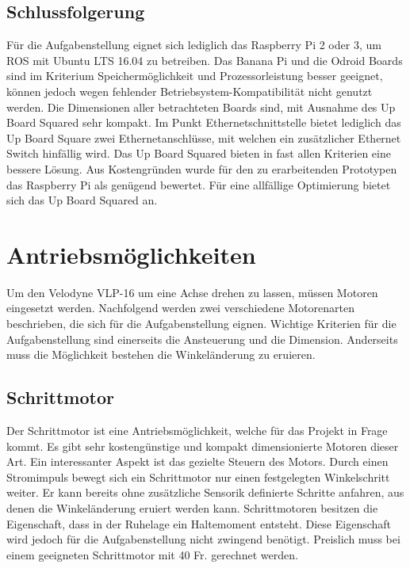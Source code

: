 \subsection{Schlussfolgerung}
\label{subsec:Schlussfolgerung}
Für die Aufgabenstellung eignet sich lediglich das Raspberry Pi 2 oder 3, um ROS mit Ubuntu LTS 16.04 zu betreiben. Das Banana Pi und die Odroid Boards sind im Kriterium Speichermöglichkeit und Prozessorleistung besser geeignet, können jedoch wegen fehlender Betriebsystem-Kompatibilität nicht genutzt werden. Die Dimensionen aller betrachteten Boards sind, mit Ausnahme des Up Board Squared sehr kompakt. Im Punkt Ethernetschnittstelle bietet lediglich das Up Board Square zwei Ethernetanschlüsse, mit welchen ein zusätzlicher Ethernet Switch hinfällig wird. Das Up Board Squared bieten in fast allen Kriterien eine bessere Lösung. Aus Kostengründen wurde für den zu erarbeitenden Prototypen das Raspberry Pi als genügend bewertet. Für eine allfällige Optimierung bietet sich das Up Board Squared an.

\section{Antriebsmöglichkeiten}
\label{sec:Antriebsmoeglichkeiten}
Um den Velodyne VLP-16 um eine Achse drehen zu lassen, müssen Motoren eingesetzt werden. Nachfolgend werden zwei verschiedene Motorenarten beschrieben, die sich für die Aufgabenstellung eignen. Wichtige Kriterien für die Aufgabenstellung sind einerseits die Ansteuerung und die Dimension. Anderseits muss die Möglichkeit bestehen die Winkeländerung zu eruieren. 

\subsection{Schrittmotor}
\label{subsec:Schrittmotor}
Der Schrittmotor ist eine Antriebsmöglichkeit, welche für das Projekt in Frage kommt. Es gibt sehr kostengünstige und kompakt dimensionierte Motoren dieser Art. Ein interessanter Aspekt ist das gezielte Steuern des Motors. Durch einen Stromimpuls bewegt sich ein Schrittmotor nur einen festgelegten Winkelschritt weiter. Er kann bereits ohne zusätzliche Sensorik definierte Schritte anfahren, aus denen die Winkeländerung eruiert werden kann. Schrittmotoren besitzen die Eigenschaft, dass in der Ruhelage ein Haltemoment entsteht. Diese Eigenschaft wird jedoch für die Aufgabenstellung nicht zwingend benötigt. Preislich muss bei einem geeigneten Schrittmotor mit 40 Fr. gerechnet werden. 

